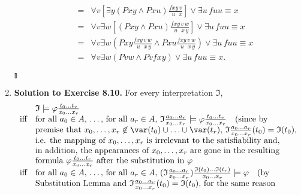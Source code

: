 \begin{enumerate}[1.]
\begin{enumerate}[(a)]
\[\begin{array}{ll}
= & \forall v [ \exists y ( Pxy \land Pxu ) \frac{fxy\,v}{\phantom{f}u\phantom{y}\,x} ] \lor \exists u \, fuu \equiv x \\
= & \forall v \exists w [ ( Pxy \land Pxu ) \frac{fxy\,v\,w}{\phantom{f}u\phantom{y}\,x\,y} ] \lor \exists u \, fuu \equiv x \\
= & \forall v \exists w ( Pxy \frac{fxy\,v\,w}{\phantom{f}u\phantom{y}\,x\,y} \land Pxu \frac{fxy\,v\,w}{\phantom{f}u\phantom{y}\,x\,y} ) \lor \exists u \, fuu \equiv x \\
= & \forall v \exists w ( Pvw \land Pvfxy ) \lor \exists u \, fuu \equiv x.
\end{array}
\]
\end{enumerate} \begin{flushright}$\talloblong$\end{flushright}
%
\item \textbf{Solution to Exercise 8.10.} For every interpretation $\mathfrak{I}$,
\[
\begin{array}{ll}
\, & \mathfrak{I} \models \varphi \frac{t_0 \ldots t_r}{x_0 \ldots x_r} \\
\mbox{iff} & \mbox{for all $a_0 \in A$, \ldots , for all $a_r \in A$, $\mathfrak{I} \frac{a_0 \ldots a_r}{x_0 \ldots x_r} \models \varphi \frac{t_0 \ldots t_r}{x_0 \ldots x_r}$ \,\, (since by} \\
\, & \mbox{premise that $x_0, \ldots , x_r \not \in \var(t_0) \cup \ldots \cup \var(t_r)$, $\mathfrak{I} \frac{a_0 \ldots a_r}{x_0 \ldots x_r} (t_0) = \mathfrak{I} (t_0)$,} \\
\, & \mbox{i.e. the mapping of $x_0, \ldots , x_r$ is irrelevant to the satisfiability and,} \\
\, & \mbox{in addition, the appearances of $x_0, \ldots , x_r$ are gone in the resulting} \\
\, & \mbox{formula $\varphi \frac{t_0 \ldots t_r}{x_0 \ldots x_r}$ after the substitution in $\varphi$} \\
\mbox{iff} & \mbox{for all $a_0 \in A$, \ldots , for all $a_r \in A$, $(\mathfrak{I} \frac{a_0 \ldots a_r}{x_0 \ldots x_r}) \frac{\mathfrak{I}(t_0) \ldots \mathfrak{I}(t_r)}{x_0 \ldots x_r} \models \varphi$ \,\, (by} \\
\, & \mbox{Substitution Lemma and $\mathfrak{I} \frac{a_0 \ldots a_r}{x_0 \ldots x_r} (t_0) = \mathfrak{I} (t_0)$, for the same reason} \\

\end{array}\]
\end{enumerate}
